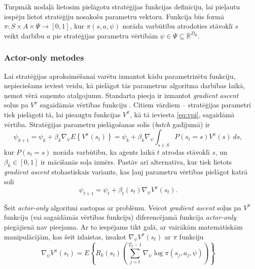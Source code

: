 \documentclass{ludis} %
\begin{document}

Turpmāk nodaļā lietosim pielāgotu stratēģijas funkcijas definīciju, lai pieļautu
iespēju lietot stratēģiju nosakošu parametru vektoru. Funkcija būs formā $\pi: S
\times A \times \Psi \rightarrow [0,1]$, kur $\pi(s, a, \psi)$ norāda varbūtību
atrodoties stāvoklī $s$ veikt darbību $a$ pie stratēģijas parametru vērtībām
$\psi \in \Psi \subseteq \mathbb{R}^{D_\Psi}$.

\subsubsection{Actor-only metodes}
 
Lai stratēģijas aproksimēšanai varētu izmantot kādu parametrizētu funkciju,
nepieciešams ieviest veidu, kā pielāgot tās parametrus algoritma darbības laikā,
ņemot vērā saņemto atalgojumu. Standarta pieeja ir izmantot \textit{gradient
  ascent} soļus pa $V^\pi$ sagaidāmās vērtības funkciju
\autocite{williams1992simple} \autocite{sutton2000policy}
\autocite{Hasselt2012}. Citiem vārdiem -- stratēģijas parametri tiek pielāgoti
tā, lai pieaugtu funkcijas $V^\pi$, kā tā ieviesta \eqref{eq:vpi}, sagaidāmā
vērtība. Stratēģijas parametru pielāgošanas solis (\textit{batch} gadījumā) ir
\[
	\psi_{k+1} = \psi_k + \beta_k \nabla_\psi E \left\{V^\pi(s_t)\right\} =
  \psi_k + \beta_k \nabla_\psi \int_{s \in S} P(s_t = s) V^\pi(s)\ ds,
\]
kur $P(s_t = s)$ norāda varbūtību, ka aģents laikā $t$ atrodas stāvoklī $s$, un
$\beta_k \in [0,1]$ ir mācīšanās soļa izmērs. Pastāv arī alternatīva, kur tiek
lietots \textit{gradient ascent} stohastiskais variants, kas ļauj parametru
vērtības pielāgot katrā solī
\begin{equation} \label{eq:stohgrad}
	\psi_{t+1} = \psi_t + \beta_t(s_t) \nabla_\psi V^\pi(s_t).
\end{equation}

Šeit \textit{actor-only} algoritmi sastopas ar problēmu. Veicot \textit{gradient
  ascent} soļus pa $V^\pi$ funkciju (vai sagaidāmās vērtības funkciju)
diferencējamā funkcija \textit{actor-only} piegājienā nav pieejama. Ar to
iespējams tikt galā, ar vairākām matemātiskām manipulācijām, kas šeit izlaistas,
izsakot $\nabla_\psi V^\pi(s_t)$ ar $\pi$ funkciju
\begin{equation} \label{eq:nablav}
	\nabla_\psi V^\pi(s_t) = E \left\{R_k(s_t)
    \left(\sum\limits_{j=t}^{T_k - 1} \nabla_\psi \log \pi(s_j, a_j, \psi) \right)
  \right\}
\end{equation}
\end{document}
